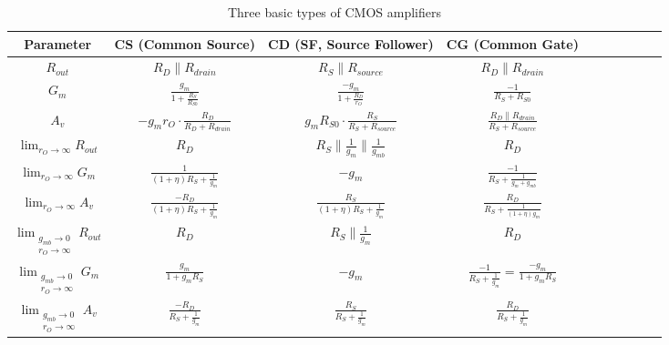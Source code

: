 \documentclass[UTF8]{article}
\begin{document}
\begin{table}[H]\centering
    \renewcommand{\arraystretch}{1.1} %
    \caption{Three basic types of CMOS amplifiers}
    \label{Three basic types of CMOS amplifiers}
    \begin{tabular}{cccccccccc}\toprule
        Parameter & CS (Common Source) & CD (SF, Source Follower) & CG (Common Gate) \\
    \midrule $R_{out}$ 
        & $ \displaystyle R_{D} \parallel R_{drain}$ 
        & $ \displaystyle R_S \parallel R_{source}$
        & $ \displaystyle R_D \parallel R_{drain}$
    \\ $ \displaystyle G_{m}$ 
    & $ \frac{g_m}{1 + \frac{R_S}{R_{S0}}} $ 
    & $ \frac{-g_m}{1 + \frac{R_D}{r_O}}$
    & $ \frac{-1}{R_S + R_{S0}}$
    \\ $ \displaystyle  A_v$ 
    & $  -g_m r_O \cdot \frac{R_D}{R_D + R_{drain}}$ 
    & $ g_m R_{S0} \cdot \frac{R_S}{R_S + R_{source}}$
    & $ \frac{R_D \parallel R_{drain}}{R_S + R_{source}}$
    \\\midrule
    $ \displaystyle \lim_{r_O \to \infty} R_{out}$ 
        & $ R_D$ 
        & $ R_{S} \parallel \frac{1}{g_m} \parallel \frac{1}{g_{mb}}$
        & $ R_D$
    \\ $ \displaystyle \lim_{r_O \to \infty} G_{m}$ 
        & $ \frac{1}{(1 + \eta) R_S + \frac{1}{g_m}}$ 
        & $ - g_m$
        & $ \frac{-1}{R_S + \frac{1}{g_m + g_{mb}}}$
    \\ $ \displaystyle \lim_{r_O \to \infty} A_v$ 
        & $ \frac{- R_D}{(1+\eta) R_S + \frac{1}{g_m} }$ 
        & $ \frac{R_S}{(1 + \eta)R_S + \frac{1}{g_m } }$
        & $ \frac{R_D}{R_S + \frac{1}{(1+\eta)g_m} }$
    \\\midrule
    $ \displaystyle \lim_{\substack{g_{mb} \to 0 \\ r_O \to \infty}} R_{out}$ 
        & $ R_D$ 
        & $ R_{S} \parallel \frac{1}{g_m}$
        & $ R_D$
    \\ $ \displaystyle \lim_{\substack{g_{mb} \to 0 \\ r_O \to \infty}} G_{m}$ 
        & $ \frac{g_m}{1 + g_m R_S}$ 
        & $ - g_m$
        & $ \frac{-1}{R_S + \frac{1}{g_m}} = \frac{- g_m}{1 + g_m R_S}$
    \\ $ \displaystyle \lim_{\substack{g_{mb} \to 0 \\ r_O \to \infty}} A_v$ 
        & $ \frac{- R_D}{R_S + \frac{1}{g_m}}$ 
        & $ \frac{R_S}{R_S + \frac{1}{g_m}}$
        & $ \frac{R_D}{R_S + \frac{1}{g_m}}$
    \\
        \bottomrule
    \end{tabular}
\end{table}
\end{document}
